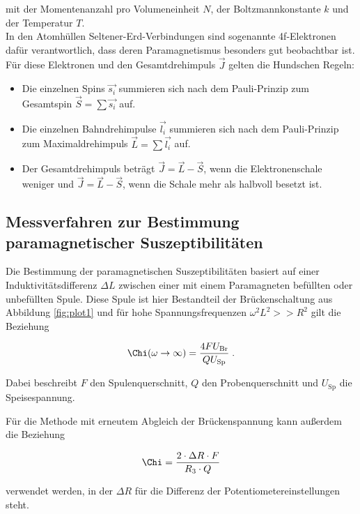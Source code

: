 mit der Momentenanzahl pro Volumeneinheit $N$, der Boltzmannkonstante $k$ und der
Temperatur $T$.\\

In den Atomhüllen Seltener-Erd-Verbindungen sind sogenannte 4f-Elektronen dafür verantwortlich,
dass deren Paramagnetismus besonders gut beobachtbar ist. Für diese Elektronen und
den Gesamtdrehimpuls $\vec{J}$ gelten die Hundschen Regeln:

\begin{itemize}
    \item Die einzelnen Spins $\vec{s_i}$ summieren sich nach dem Pauli-Prinzip zum Gesamtspin
    $\vec{S} = \sum \vec{s_i}$ auf.
    \item Die einzelnen Bahndrehimpulse $\vec{l_i}$ summieren sich nach dem Pauli-Prinzip zum Maximaldrehimpuls 
    $\vec{L} = \sum \vec{l_i}$ auf.
    \item Der Gesamtdrehimpuls beträgt $\vec{J} = \vec{L} - \vec{S}$, wenn die Elektronenschale weniger und
    $\vec{J} = \vec{L} - \vec{S}$, wenn die Schale mehr als halbvoll besetzt ist.
\end{itemize}

\subsection{Messverfahren zur Bestimmung paramagnetischer Suszeptibilitäten}

Die Bestimmung der paramagnetischen Suszeptibilitäten basiert auf einer
Induktivitätsdifferenz $\Delta L$ zwischen einer mit einem Paramagneten 
befüllten oder unbefüllten Spule. Diese Spule ist hier Bestandteil der
Brückenschaltung aus Abbildung \ref{fig:plot1} und für hohe Spannungsfrequenzen
$\omega^2 L^2 >> R^2$ gilt die Beziehung 

\begin{equation}
    \Chi (\omega \to \infty) = \frac{4 F U_\text{Br}}{Q U_\text{Sp}} \; .
\end{equation} 

Dabei beschreibt $F$ den Spulenquerschnitt, $Q$ den Probenquerschnitt und
$U_\text{Sp}$ die Speisespannung.

Für die Methode mit erneutem Abgleich der Brückenspannung 
kann außerdem die Beziehung 

\begin{equation}
    \Chi = \frac{2 \cdot \Delta R \cdot F}{R_3\cdot Q}
    \label{eqn:alternativ}
\end{equation}

verwendet werden, in der $\Delta R$ für die Differenz der Potentiometereinstellungen
steht.


















